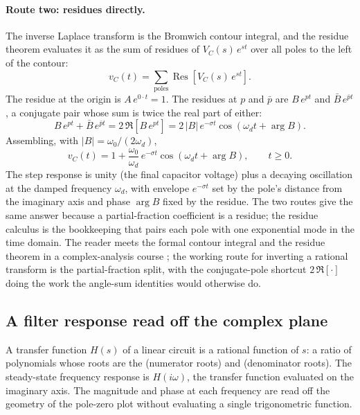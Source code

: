\paragraph{Route two: residues directly.} The inverse Laplace transform
is the Bromwich contour integral, and the residue theorem evaluates it as
the sum of residues of $V_{C}(s)\,e^{st}$ over all poles to the left of
the contour:
\[
v_{C}(t) = \sum_{\text{poles}} \operatorname{Res}\left[V_{C}(s)\,e^{st}\right].
\]
The residue at the origin is $A\,e^{0 \cdot t} = 1$. The residues at $p$
and $\bar p$ are $B\,e^{pt}$ and $\bar B\,e^{\bar p t}$, a conjugate pair
whose sum is twice the real part of either:
\[
B\,e^{pt} + \bar B\,e^{\bar p t} = 2\,\Re\!\left[B\,e^{pt}\right]
= 2\,|B|\,e^{-\sigma t}\cos(\omega_{d} t + \arg B).
\]
Assembling, with $|B| = \omega_{0}/(2\omega_{d})$,
\[
v_{C}(t) = 1 + \frac{\omega_{0}}{\omega_{d}}\,e^{-\sigma t}
\cos(\omega_{d} t + \arg B), \qquad t \ge 0.
\]
The step response is unity (the final capacitor voltage) plus a decaying
oscillation at the damped frequency $\omega_{d}$, with envelope
$e^{-\sigma t}$ set by the pole's distance from the imaginary axis and
phase $\arg B$ fixed by the residue. The two routes give the same answer
because a partial-fraction coefficient is a residue; the residue calculus
is the bookkeeping that pairs each pole with one exponential mode in the
time domain. The reader meets the formal contour integral and the residue
theorem in a complex-analysis course \cite[chapter 3]{text:v2ch03-stein-shakarchi-complex};
the working route for inverting a rational transform is the
partial-fraction split, with the conjugate-pole shortcut $2\,\Re[\cdot]$
doing the work the angle-sum identities would otherwise do.

\subsection{A filter response read off the complex plane}

A transfer function $H(s)$ of a linear circuit is a rational function of
$s$: a ratio of polynomials whose roots are the 
(numerator roots) and  (denominator roots). The steady-state
frequency response is $H(i\omega)$, the transfer function evaluated on the
imaginary axis. The magnitude and phase at each frequency are read off
the geometry of the pole-zero plot without evaluating a single
trigonometric function.

